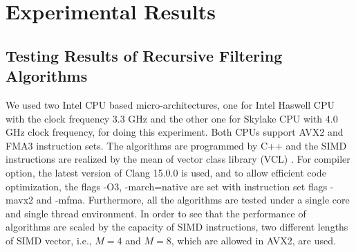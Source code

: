 \section{Experimental Results}
\label{sec:experiment}

\subsection{Testing Results of Recursive Filtering Algorithms}

We used two Intel CPU based micro-architectures, one for Intel Haswell CPU with the clock frequency 3.3 GHz
and the other one for Skylake CPU with 4.0 GHz clock frequency, for doing this experiment.
Both CPUs support AVX2 and FMA3 instruction sets. 
The algorithms are programmed by C++ and the SIMD instructions are realized
by the mean of vector class library (VCL) \cite{Agner_04}.
For compiler option, the latest version of Clang 15.0.0
is used, and to allow efficient code optimization, 
the flags -O3, -march=native are set with instruction set flags -mavx2 and -mfma. 
Furthermore, all the algorithms are tested under a single core and single thread environment.
In order to see that the performance of algorithms are scaled by the capacity of SIMD instructions, two 
different lengths of SIMD vector, i.e., $M=4$ and $M=8$, which are allowed in AVX2, are used. 

